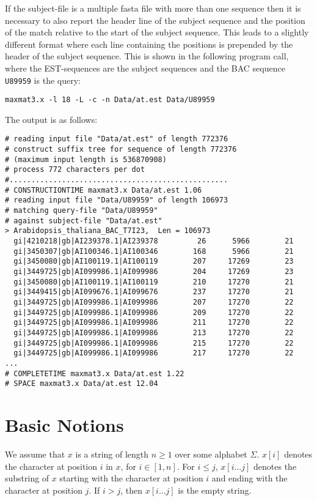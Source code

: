 \documentclass[12pt]{article}
\newcommand{\Subs}[3]{#1[#2\ldots#3]}
\begin{document}
If the subject-file is a multiple fasta file with more than one sequence
then it is necessary to also report the header line of the subject sequence 
and the position of the match relative to the start of the subject sequence.
This leads to a slightly different format where each line containing the
positions is prepended by the  header of the subject sequence. This is
shown in the following program call, where the EST-sequences
are the subject sequences and the BAC sequence \texttt{U89959}
is the query:

\begin{verbatim}
maxmat3.x -l 18 -L -c -n Data/at.est Data/U89959 
\end{verbatim}

The output is as follows:

\begin{small}
\begin{verbatim}
# reading input file "Data/at.est" of length 772376
# construct suffix tree for sequence of length 772376
# (maximum input length is 536870908)
# process 772 characters per dot
#..................................................
# CONSTRUCTIONTIME maxmat3.x Data/at.est 1.06
# reading input file "Data/U89959" of length 106973
# matching query-file "Data/U89959"
# against subject-file "Data/at.est"
> Arabidopsis_thaliana_BAC_T7I23,  Len = 106973
  gi|4210218|gb|AI239378.1|AI239378         26      5966        21
  gi|3450307|gb|AI100346.1|AI100346        168      5966        21
  gi|3450080|gb|AI100119.1|AI100119        207     17269        23
  gi|3449725|gb|AI099986.1|AI099986        204     17269        23
  gi|3450080|gb|AI100119.1|AI100119        210     17270        21
  gi|3449415|gb|AI099676.1|AI099676        237     17270        21
  gi|3449725|gb|AI099986.1|AI099986        207     17270        22
  gi|3449725|gb|AI099986.1|AI099986        209     17270        22
  gi|3449725|gb|AI099986.1|AI099986        211     17270        22
  gi|3449725|gb|AI099986.1|AI099986        213     17270        22
  gi|3449725|gb|AI099986.1|AI099986        215     17270        22
  gi|3449725|gb|AI099986.1|AI099986        217     17270        22
...
# COMPLETETIME maxmat3.x Data/at.est 1.22
# SPACE maxmat3.x Data/at.est 12.04
\end{verbatim}
\end{small}

\section{Basic Notions}\label{SecBasicNotions}
We assume that \(x\) is a string of length \(n\geq 1\) over some 
alphabet \(\Sigma\).
$x[i]$ denotes the character at position $i$ in $x$,
for $i\in[1,n]$. For $i\leq j$, $\Subs{x}{i}{j}$ denotes the 
substring of $x$ starting with the character at position $i$
and ending with the character at position $j$. If \(i>j\), then 
\(\Subs{x}{i}{j}\) is the empty string.
\end{document}
